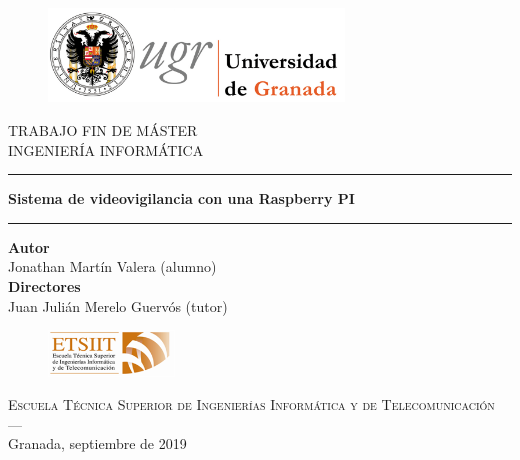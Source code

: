	\begin{figure}[h]
		\centering
		\includegraphics[width=0.7\textwidth]{images/logoUGR.jpg}
		\label{imagen2}
	\end{figure}

	\begin{center}
		\Large{TRABAJO FIN DE MÁSTER} \\
		\large{INGENIERÍA INFORMÁTICA}
	\end{center}
	
	\vspace{0.5cm}
	
	\hrule
	
	\begin{center}
		\huge{\textbf{Sistema de videovigilancia con una Raspberry PI}}
	\end{center}
	
	\hrule
	
	\vspace{0.5cm}
	
	\begin{center}
		\textbf{Autor} \\
		Jonathan Martín Valera (alumno)\\
		\textbf{Directores}\\
		Juan Julián Merelo Guervós (tutor)
	\end{center}
	
	\vspace{0.6cm}
	
	\begin{figure}[h]
		\centering
		\includegraphics[width=0.3\textwidth]{images/etsiit_logo.png}\\[0.1cm]
	\end{figure}
	
	\begin{center}
	\textsc{Escuela Técnica Superior de Ingenierías Informática y de Telecomunicación}\\
	\textsc{---}\\
	Granada, septiembre de 2019
	\end{center}
	
	\newpage
